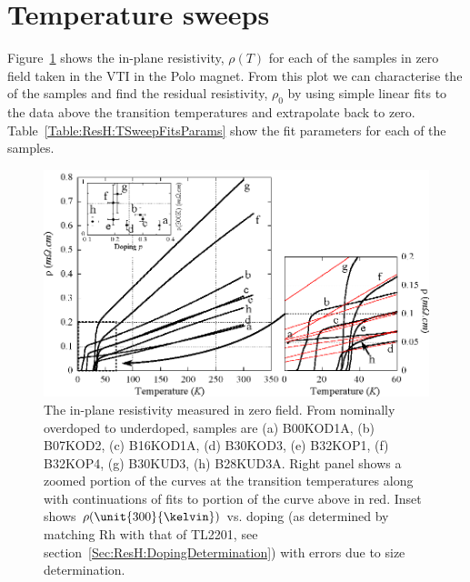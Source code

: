 \section{Temperature sweeps}

Figure~\ref{Fig:ResH:TSweeps} shows the in-plane resistivity, $\rho(T)$ for each of the samples in zero field taken in the \ac{VTI} in the Polo magnet. From this plot we can characterise the \Tc of the samples and find the residual resistivity, $\rho_0$ by using simple linear fits to the data above the transition temperatures and extrapolate back to zero. Table~\ref{Table:ResH:TSweepFitsParams} show the fit parameters for each of the samples. 
\begin{figure}[htbp]
	\begin{center}
		\includegraphics[scale=1.0]{Chapter-HallBSCO/Figures/TSweeps/TSweeps}
		\caption{The in-plane resistivity measured in zero field. From nominally overdoped to underdoped, samples are (a) B00KOD1A, (b) B07KOD2, (c) B16KOD1A, (d) B30KOD3, (e) B32KOP1, (f) B32KOP4, (g) B30KUD3, (h) B28KUD3A. Right panel shows a zoomed portion of the curves at the transition temperatures along with continuations of fits to portion of the curve above \Tc in red. Inset shows $\rho(\unit{300}{\kelvin})$ vs. doping (as determined by matching Rh with that of \ac{TL2201}, see section~\ref{Sec:ResH:DopingDetermination}) with errors due to size determination.}
		\label{Fig:ResH:TSweeps}
	\end{center}
\end{figure}
